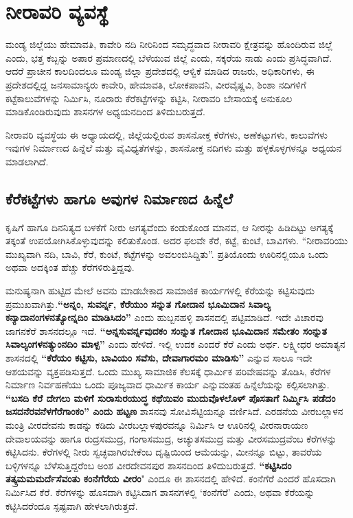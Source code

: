 \chapter{ನೀರಾವರಿ ವ್ಯವಸ್ಥೆ}

ಮಂಡ್ಯ ಜಿಲ್ಲೆಯು ಹೇಮಾವತಿ, ಕಾವೇರಿ ನದಿ ನೀರಿನಿಂದ ಸಮೃದ್ಧವಾದ ನೀರಾವರಿ ಕ್ಷೇತ್ರವನ್ನು ಹೊಂದಿರುವ ಜಿಲ್ಲೆ ಎಂದು, ಭತ್ತ ಕಬ್ಬನ್ನು ಅಪಾರ ಪ್ರಮಾಣದಲ್ಲಿ ಬೆಳೆಯುವ ಜಿಲ್ಲೆ ಎಂದು, ಸಕ್ಕರೆಯ ನಾಡು ಎಂದು ಪ್ರಸಿದ್ಧವಾಗಿದೆ. ಆದರೆ ಪ್ರಾಚೀನ ಕಾಲದಿಂದಲೂ ಮಂಡ್ಯ ಜಿಲ್ಲಾ ಪ್ರದೇಶದಲ್ಲಿ ಆಳ್ವಿಕೆ ಮಾಡಿದ ರಾಜರು, ಅಧಿಕಾರಿಗಳು, ಈ ಪ್ರದೇಶದಲ್ಲಿದ್ದ ಜನಸಾಮಾನ್ಯರು ಕಾವೇರಿ, ಹೇಮಾವತಿ, ಲೋಕಪಾವನಿ, ವೀರವೈಷ್ಣವಿ, ಶಿಂಶಾ ನದಿಗಳಿಗೆ ಕಟ್ಟೆಕಾಲುವೆಗಳನ್ನು ನಿರ್ಮಿಸಿ, ನೂರಾರು ಕೆರೆಕಟ್ಟೆಗಳನ್ನು ಕಟ್ಟಿಸಿ, ನೀರಾವರಿ ಬೇಸಾಯಕ್ಕೆ ಅನುಕೂಲ ಮಾಡಿಕೊಂಡಿರುವುದು ಶಾಸನಗಳ ಅಧ್ಯಯನದಿಂದ ತಿಳಿದುಬರುತ್ತದೆ.

ನೀರಾವರಿ ವ್ಯವಸ್ಥೆಯ ಈ ಅಧ್ಯಾಯದಲ್ಲಿ, ಜಿಲ್ಲೆಯಲ್ಲಿರುವ ಶಾಸನೋಕ್ತ ಕೆರೆಗಳು, ಅಣೆಕಟ್ಟುಗಳು, ಕಾಲುವೆಗಳು ಇವುಗಳ ನಿರ್ಮಾಣದ ಹಿನ್ನೆಲೆ ಮತ್ತು ವೈವಿಧ್ಯತೆಗಳನ್ನು, ಶಾಸನೋಕ್ತ ನದಿಗಳು ಮತ್ತು ಹಳ್ಳಕೊಳ್ಳಗಳನ್ನೂ ಅಧ್ಯಯನ ಮಾಡಲಾಗಿದೆ.

\section*{ಕೆರೆಕಟ್ಟೆಗಳು ಹಾಗೂ ಅವುಗಳ ನಿರ್ಮಾಣದ ಹಿನ್ನೆಲೆ}

ಕೃಷಿಗೆ ಹಾಗೂ ದಿನನಿತ್ಯದ ಬಳಕೆಗೆ ನೀರು ಅಗತ್ಯವೆಂದು ಕಂಡುಕೊಂಡ ಮಾನವ, ಆ ನೀರನ್ನು ಹಿಡಿದಿಟ್ಟು ಅಗತ್ಯಕ್ಕೆ ತಕ್ಕಂತೆ ಉಪಯೋಗಿಸಿಕೊಳ್ಳುವುದನ್ನು ಕಲಿತುಕೊಂಡ. ಅದರ ಫಲವೇ ಕೆರೆ, ಕಟ್ಟೆ, ಕುಂಟೆ, ಬಾವಿಗಳು. “ನೀರಾವರಿಯು ಮುಖ್ಯವಾಗಿ ನದಿ, ಬಾವಿ, ಕೆರೆ, ಕುಂಟೆ, ಕಟ್ಟೆಗಳನ್ನು ಅವಲಂಬಿಸಿದ್ದಿತು”. ಪ್ರತಿಯೊಂದು ಊರಿನಲ್ಲಿಯೂ ಒಂದು ಅಥವಾ ಅದಕ್ಕಿಂತ ಹೆಚ್ಚು ಕೆರೆಗಳಿರುತ್ತಿದ್ದವು.

ಮನುಷ್ಯನಾಗಿ ಹುಟ್ಟಿದ ಮೇಲೆ ಅವನು ಮಾಡಬೇಕಾದ ಸಾಮಾಜಿಕ ಕಾರ್ಯಗಳಲ್ಲಿ ಕೆರೆಯನ್ನು ಕಟ್ಟಿಸುವುದು ಪ್ರಮುಖವಾಗಿತ್ತು.\textbf{“ಅನ್ನಂ, ಸುವರ್ನ್ನ, ಕೆರೆಯುಂ ಸನ್ನುತ ಗೋದಾನ ಭೂಮಿದಾನ ಸಿವಾಲ್ಯ ಕನ್ಯಾದಾನಂಗಳನತ್ಯೋನ್ನದಿಂ ಮಾಡಿಸಿದಂ” }ಎಂದು ಹುಬ್ಬನಹಳ್ಳಿ ಶಾಸನದಲ್ಲಿ ಪಟ್ಟಿಮಾಡಿದೆ. ಇದೇ ವಿಚಾರವು ಜಾಗನಕೆರೆ ಶಾಸನದಲ್ಲೂ ಇದೆ. \textbf{“ಅನ್ನಸುವರ್ನ್ನವುದಕಂ ಸಂನ್ನುತ ಗೋದಾನ ಭೂಮಿದಾನ ಸಮೇತಂ ಸಂನ್ನುತ ಸಿವಾಲ್ಯಂಗಳನತ್ಯುಂನದಿಂ ಮಾಳ್ಪ”} ಎಂದು ಹೇಳಿದೆ. ಇಲ್ಲಿ ಉದಕ ಎಂದರೆ ಕೆರೆ ಎಂದು ಅರ್ಥ. ಲಕ್ಷ್ಮೀಧರ ಅಮಾತ್ಯನ ಶಾಸನದಲ್ಲಿ \textbf{“ಕೆರೆಯಂ ಕಟ್ಟಿಸು, ಬಾವಿಯಂ ಸವೆಸು, ದೇವಾಗಾರಮಂ ಮಾಡಿಸು”} ಎನ್ನುವ ಸಾಲೂ ಇದೇ ಆಶಯವನ್ನು ವ್ಯಕ್ತಪಡಿಸುತ್ತದೆ. ಒಂದು ಮುಖ್ಯ ಸಾಮಾಜಿಕ ಕೆಲಸಕ್ಕೆ ಧಾರ್ಮಿಕ ಪರಿವೇಷವನ್ನು ತೊಡಿಸಿ, ಕೆರೆಗಳ ನಿರ್ಮಾಣ ನಿರ್ವಹಣೆಯು ಒಂದು ಪೂಜ್ಯವಾದ ಧಾರ್ಮಿಕ ಕಾರ್ಯ ಎನ್ನುವಂತಹ ಹಿನ್ನೆಲೆಯನ್ನು ಕಲ್ಪಿಸಲಾಗಿತ್ತು. \textbf{“ಬಸದಿ ಕೆರೆ ದೇಗಲು ಮಳಿಗೆ ಸುರಾಸುರಯುದ್ಧ ಕಥೆಯಿವಂ ಮುದುವೊಳಲೊಳ್​ ಪೊಸತಾಗೆ ನಿರ್ಮ್ಮಿಸಿ ಪಡೆದಂ ಜಸದನೆರವನೆಳಗೆರೆಗಾಂಕಂ” ಎಂದು ಹಟ್ಟಣ }ಶಾಸನವು ಸೋವಿಸೆಟ್ಟಿಯನ್ನೂ ವರ್ಣಿಸಿದೆ. ಎರಡನೆಯ ವೀರಬಲ್ಲಾಳನ ಮಂತ್ರಿ ವೀರದೇವನು ಕಾಡನ್ನು ಕಡಿದು ವೀರಬಲ್ಲಾಳಪುರವನ್ನೂ ನಿರ್ಮಿಸಿ ಆ ಊರಿನಲ್ಲಿ ವೀರನಾರಾಯಣ ದೇವಾಲಯವನ್ನು ಹಾಗೂ ರುದ್ರಸಮುದ್ರ, ಗಂಗಾಸಮುದ್ರ, ಅಚ್ಯುತಸಮುದ್ರ ಮತ್ತು ವೀರಸಮುದ್ರವೆಂಬ ಕೆರೆಗಳನ್ನು ಕಟ್ಟಿಸಿದನು. ಕೆರೆಗಳಲ್ಲಿ ನೀರು ಸ್ವಚ್ಛವಾಗಿರಬೇಕೆಂಬ ದೃಷ್ಟಿಯಿಂದ ಆಮೆಯನ್ನು, ಮೀನನ್ನೂ ಬಿಟ್ಟು, ತಾವರೆಯ ಬಳ್ಳಿಗಳನ್ನೂ ಬೆಳೆಸುತ್ತಿದ್ದರೆಂಬ ಅಂಶ ವೀರದೇವನಪುರ ಶಾಸನದಿಂದ ತಿಳಿದುಬರುತ್ತದೆ.\textbf{ “ಕಟ್ಟಿಸಿದಂ ತತ್ಕ್ರಮಮಮರ್ದೆಸೆವಂತು ಕಂನೆಗೆರೆಯ ವೀರಂ}" ಎಂದೂ ಈ ಶಾಸನದಲ್ಲಿ ಹೇಳಿದೆ. ಕಂನೆಗೆರೆ ಎಂದರೆ ಹೊಸದಾಗಿ ನಿರ್ಮಿಸಿದ ಕೆರೆ. ಕೆರೆಗಳನ್ನು ಹೊಸದಾಗಿ ಕಟ್ಟಿಸಿದಾಗ ಶಾಸನಗಳಲ್ಲಿ ‘ಕಂನೆಗೆರೆ’ ಎಂದು, ಅಥವಾ ಕೆರೆಯನ್ನು ಕಟ್ಟಿಸಿದರೆಂದೂ ಸ್ಪಷ್ಟವಾಗಿ ಹೇಳಲಾಗಿರುತ್ತದೆ.

